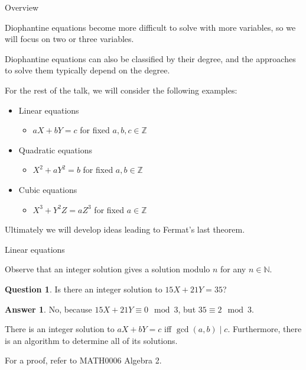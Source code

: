 \documentclass[10pt]{beamer}
\theoremstyle{definition}
\newtheorem{answer}{Answer}
\newtheorem{question}{Question}
\begin{document}
\begin{frame}[t]{Overview}

Diophantine equations become more difficult to solve with more variables, so we will focus on two or three variables.

\vspace{0.5cm} Diophantine equations can also be classified by their degree, and the approaches to solve them typically depend on the degree.

\vspace{0.5cm} For the rest of the talk, we will consider the following examples:
\begin{itemize}
\item Linear equations
\begin{itemize}
\item $ aX + bY = c $ for fixed $ a, b, c \in \mathbb{Z} $
\end{itemize}
\item Quadratic equations
\begin{itemize}
\item $ X^2 + aY^2 = b $ for fixed $ a, b \in \mathbb{Z} $
\end{itemize}
\item Cubic equations
\begin{itemize}
\item $ X^3 + Y^2Z = aZ^3 $ for fixed $ a \in \mathbb{Z} $
\end{itemize}
\end{itemize}
Ultimately we will develop ideas leading to Fermat's last theorem.

\end{frame}

\begin{frame}[t]{Linear equations}

Observe that an integer solution gives a solution modulo $ n $ for any $ n \in \mathbb{N} $.

\vspace{0.5cm}

\begin{question}
Is there an integer solution to $ 15X + 21Y = 35 $?
\end{question}

\begin{answer}
No, because $ 15X + 21Y \equiv 0 \mod 3 $, but $ 35 \equiv 2 \mod 3 $.
\end{answer}

\vspace{0.5cm}

\begin{theorem}
There is an integer solution to $ aX + bY = c $ iff $ \gcd(a, b) \mid c $. Furthermore, there is an algorithm to determine all of its solutions.
\end{theorem}

\vspace{0.5cm} For a proof, refer to MATH0006 Algebra 2.

\end{frame}
\end{document}

